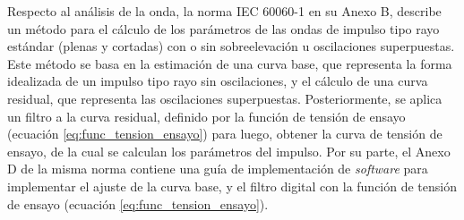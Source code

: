Respecto al análisis de la onda, la norma IEC 60060-1 en su Anexo B, describe un método para el cálculo de los parámetros de las ondas de impulso tipo rayo estándar (plenas y cortadas) con o sin sobreelevación u oscilaciones superpuestas. Este método se basa en la estimación de una curva base, que representa la forma idealizada de un impulso tipo rayo sin oscilaciones, y el cálculo de una curva residual, que representa las oscilaciones superpuestas. Posteriormente, se aplica un filtro a la curva residual, definido por la función de tensión de ensayo (ecuación \ref{eq:func_tension_ensayo}) para luego, obtener la curva de tensión de ensayo, de la cual se calculan los parámetros del impulso. Por su parte, el Anexo D de la misma norma contiene una guía de implementación de \emph{software} para implementar el ajuste de la curva base, y el filtro digital con la función de tensión de ensayo (ecuación \ref{eq:func_tension_ensayo}).